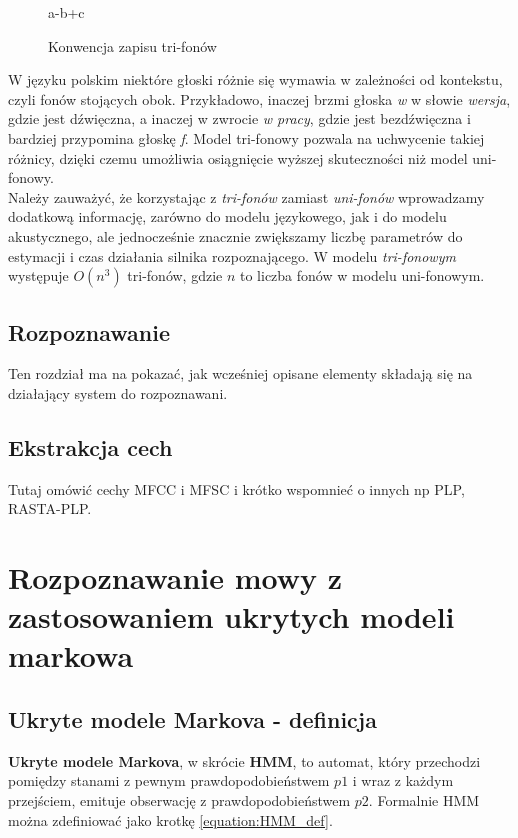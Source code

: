 \documentclass[11pt]{article}
\begin{document}
		\begin{figure}[H]
			\begin{center}
			{a-b+c}
			\end{center}
			\caption{Konwencja zapisu tri-fonów}
			\label{fig:tri-fony_notacja}
		\end{figure}
	
		W języku polskim niektóre głoski różnie się wymawia w zależności od kontekstu, czyli fonów stojących obok. Przykładowo, inaczej brzmi głoska \textit{w} w słowie \textit{wersja}, gdzie jest dźwięczna, a inaczej w zwrocie \textit{w pracy}, gdzie jest bezdźwięczna i bardziej przypomina głoskę \textit{f}. Model tri-fonowy pozwala na uchwycenie takiej różnicy, dzięki czemu umożliwia osiągnięcie wyższej skuteczności niż model uni-fonowy.
		\\
		Należy zauważyć, że korzystając z \textit{tri-fonów} zamiast \textit{uni-fonów} wprowadzamy dodatkową informację, zarówno do modelu językowego, jak i do modelu akustycznego, ale jednocześnie znacznie zwiększamy liczbę parametrów do estymacji i czas działania silnika rozpoznającego. W modelu \textit{tri-fonowym} występuje $O(n^3)$ tri-fonów, gdzie $n$ to liczba fonów w modelu uni-fonowym.  
		
	\subsection{ Rozpoznawanie }
		Ten rozdział ma na pokazać, jak wcześniej opisane elementy składają się na działający system do rozpoznawani.
	\subsection{ Ekstrakcja cech }
	\label{sec:Feature_vec}
	Tutaj omówić cechy MFCC i MFSC i krótko wspomnieć o innych np PLP, RASTA-PLP.
	

\section {Rozpoznawanie mowy z zastosowaniem ukrytych modeli markowa}
	\label{sec:ASR_HMM}
    \subsection{Ukryte modele Markova - definicja}
    
	    \textbf{Ukryte modele Markova}, w skrócie \textbf{HMM}, to automat, który przechodzi pomiędzy stanami z pewnym prawdopodobieństwem $p1$ i wraz z każdym przejściem, emituje obserwację z prawdopodobieństwem $p2$. Formalnie HMM można zdefiniować jako krotkę \ref{equation:HMM_def}.
	    
\end{document}
